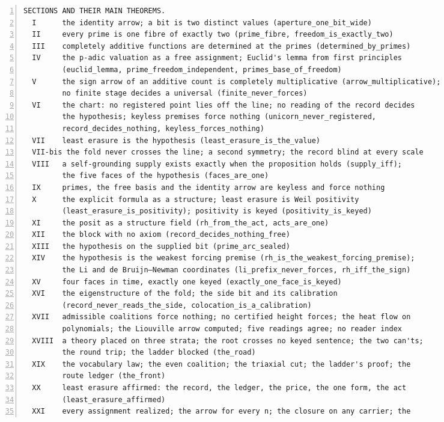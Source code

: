\documentclass[10pt]{article}
\newcommand{\leansize}{\fontsize{5.5pt}{6.75pt}\selectfont}
\begin{document}
\begin{multicols}{2}
\begin{Verbatim}[numbers=left,firstnumber=1,numbersep=3pt,xleftmargin=2.6em,breaklines=true,breakanywhere=true,breakautoindent=false,breakindent=1.4em,breaksymbolleft={},breakanywheresymbolpre={},fontsize=\leansize]
  SECTIONS AND THEIR MAIN THEOREMS.
  I      the identity arrow; a bit is two distinct values (aperture_one_bit_wide)
  II     every prime is one fibre of exactly two (prime_fibre, freedom_is_exactly_two)
  III    completely additive functions are determined at the primes (determined_by_primes)
  IV     the p-adic valuation as a free assignment; Euclid's lemma from first principles
         (euclid_lemma, prime_freedom_independent, primes_base_of_freedom)
  V      the sign arrow of an additive count is completely multiplicative (arrow_multiplicative);
         no finite stage decides a universal (finite_never_forces)
  VI     the chart: no registered point lies off the line; no reading of the record decides
         the hypothesis; keyless premises force nothing (unicorn_never_registered,
         record_decides_nothing, keyless_forces_nothing)
  VII    least erasure is the hypothesis (least_erasure_is_the_value)
  VII-bis the fold never crosses the line; a second symmetry; the record blind at every scale
  VIII   a self-grounding supply exists exactly when the proposition holds (supply_iff);
         the five faces of the hypothesis (faces_are_one)
  IX     primes, the free basis and the identity arrow are keyless and force nothing
  X      the explicit formula as a structure; least erasure is Weil positivity
         (least_erasure_is_positivity); positivity is keyed (positivity_is_keyed)
  XI     the posit as a structure field (rh_from_the_act, acts_are_one)
  XII    the block with no axiom (record_decides_nothing_free)
  XIII   the hypothesis on the supplied bit (prime_arc_sealed)
  XIV    the hypothesis is the weakest forcing premise (rh_is_the_weakest_forcing_premise);
         the Li and de Bruijn–Newman coordinates (li_prefix_never_forces, rh_iff_the_sign)
  XV     four faces in time, exactly one keyed (exactly_one_face_is_keyed)
  XVI    the eigenstructure of the fold; the side bit and its calibration
         (record_never_reads_the_side, colocation_is_a_calibration)
  XVII   admissible coalitions force nothing; no certified height forces; the heat flow on
         polynomials; the Liouville arrow computed; five readings agree; no reader index
  XVIII  a theory placed on three strata; the root crosses no keyed sentence; the two can'ts;
         the round trip; the ladder blocked (the_road)
  XIX    the vocabulary law; the even coalition; the triaxial cut; the ladder's proof; the
         route ledger (the_front)
  XX     least erasure affirmed: the record, the ledger, the price, the one form, the act
         (least_erasure_affirmed)
  XXI    every assignment realized; the arrow for every n; the closure on any carrier; the

\end{Verbatim}
\end{multicols}
\end{document}
